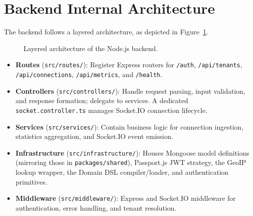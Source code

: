 \documentclass[12pt]{report}
\begin{document}
\section{Backend Internal Architecture}

The backend follows a layered architecture, as depicted in Figure~\ref{fig:backend}.

\begin{figure}[H]
\centering
{}
\caption{Layered architecture of the Node.js backend.}
\label{fig:backend}
\end{figure}

\begin{itemize}
    \item \textbf{Routes} (\texttt{src/routes/}): Register Express routers for
          \texttt{/auth}, \texttt{/api/tenants}, \texttt{/api/connections},
          \texttt{/api/metrics}, and \texttt{/health}.
    \item \textbf{Controllers} (\texttt{src/controllers/}): Handle request parsing, input
          validation, and response formation; delegate to services. A dedicated
          \texttt{socket.controller.ts} manages Socket.IO connection lifecycle.
    \item \textbf{Services} (\texttt{src/services/}): Contain business logic for connection
          ingestion, statistics aggregation, and Socket.IO event emission.
    \item \textbf{Infrastructure} (\texttt{src/infrastructure/}): Houses Mongoose model
          definitions (mirroring those in \texttt{packages/shared}), Passport.js JWT
          strategy, the GeoIP lookup wrapper, the Domain DSL compiler/loader, and
          authentication primitives.
    \item \textbf{Middleware} (\texttt{src/middleware/}): Express and Socket.IO middleware
          for authentication, error handling, and tenant resolution.
\end{itemize}
\end{document}
